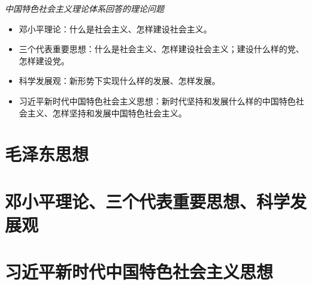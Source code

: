 \documentclass[oneside]{book}
\newcommand{\firstOrder}[1]{\textcolor{WildStrawberry}{\emph{#1}}}
\begin{document}
\begin{spacing}{1.2}
    \firstOrder{中国特色社会主义理论体系回答的理论问题}
    \begin{itemize}
        \item 邓小平理论：什么是社会主义、怎样建设社会主义。
        \item 三个代表重要思想：什么是社会主义、怎样建设社会主义；建设什么样的党、怎样建设党。
        \item 科学发展观：新形势下实现什么样的发展、怎样发展。
        \item 习近平新时代中国特色社会主义思想：新时代坚持和发展什么样的中国特色社会主义、怎样坚持和发展中国特色社会主义。
    \end{itemize}

\tableofcontents

\mainmatter
\part{毛泽东思想}





\part{邓小平理论、三个代表重要思想、科学发展观}




\part{习近平新时代中国特色社会主义思想}








\end{spacing}
\end{document}
